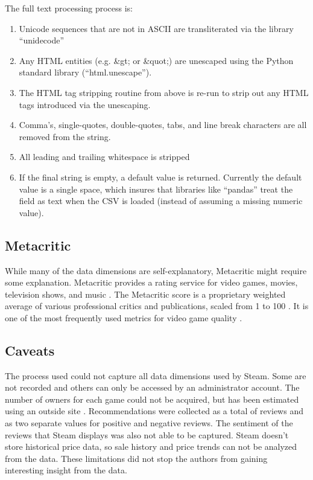 \documentclass[letterpaper,10pt,twocolumn]{article}
\begin{document}
The full text processing process is:

\begin{enumerate}
    \item Unicode sequences that are not in ASCII are transliterated via the
    library ``unidecode'' \cite{unidecode}

    \item Any HTML entities (e.g. \&gt; or \&quot;) are unescaped using the Python
    standard library (``html.unescape'').

    \item The HTML tag stripping routine from above is re-run to strip out any
    HTML tags introduced via the unescaping.

    \item Comma's, single-quotes, double-quotes, tabs, and line break characters are
    all removed from the string.

    \item All leading and trailing whitespace is stripped

    \item If the final string is empty, a default value is returned. Currently the
    default value is a single space, which insures that libraries like ``pandas''
    treat the field as text when the CSV is loaded (instead of assuming a missing
    numeric value).
\end{enumerate}


\subsection{Metacritic}

While many of the data dimensions are self-explanatory, Metacritic might
require some explanation. Metacritic provides a rating service for video
games, movies, television shows, and music \cite{metacritic}. The Metacritic
score is a proprietary weighted average of various professional critics and
publications, scaled from 1 to 100 \cite{metacritic-score}. It is one of the
most frequently used metrics for video game quality \cite{metacritic-vgdominant}.


\subsection{Caveats}

The process used could not capture all data dimensions used by Steam. Some are
not recorded and others can only be accessed by an administrator account. The
number of owners for each game could not be acquired, but has been estimated
using an outside site \cite{steamspy}. Recommendations were collected as a
total of reviews and as two separate values for positive and negative reviews.
The sentiment of the reviews that Steam displays was also not able to be
captured. Steam doesn't store historical price data, so sale history and
price trends can not be analyzed from the data. These limitations did not stop
the authors from gaining interesting insight from the data.
\end{document}
